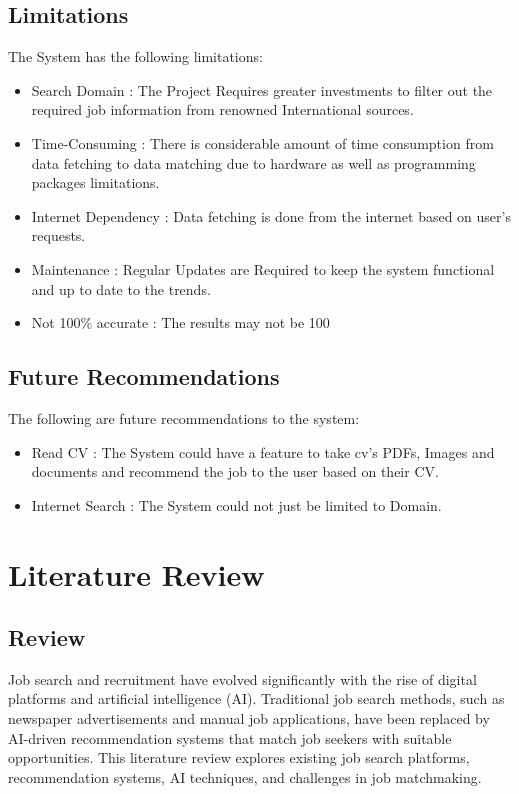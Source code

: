 \documentclass[a4paper,12pt]{report}
\begin{document}
        \section{Limitations}
        The System has the following limitations:
        \begin{itemize}
            \item Search Domain : The Project Requires greater investments to filter out the required job information from renowned International sources.
            \item Time-Consuming : There is considerable amount of time consumption from data fetching to data matching due to hardware as well as programming packages limitations.
            \item Internet Dependency : Data fetching is done from the internet based on user’s requests.
            \item Maintenance : Regular Updates are Required to keep the system functional and up to date to the trends.
            \item Not 100\% accurate : The results may not be 100%

        \end{itemize}

        \section{Future Recommendations}
        The following are future recommendations to the system:
        \begin{itemize}
            \item Read CV : The System could have a feature to take cv's PDFs, Images and documents and recommend the job to the user based on their CV.
            \item Internet Search : The System could not just be limited to Domain.
        \end{itemize}
        \newpage

        \chapter{Literature Review}
        \section{Review}
        Job search and recruitment have evolved significantly with the rise of digital platforms and artificial intelligence (AI). Traditional job search methods, such as newspaper advertisements and manual job applications, have been replaced by AI-driven recommendation systems that match job seekers with suitable opportunities. This literature review explores existing job search platforms, recommendation systems, AI techniques, and challenges in job matchmaking.
\end{document}
